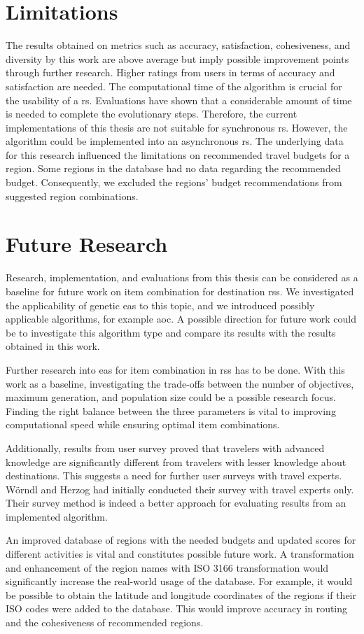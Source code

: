 \section{Limitations}
The results obtained on metrics such as accuracy, satisfaction, cohesiveness, and diversity by this work are above average but imply possible improvement points through further research. Higher ratings from users in terms of accuracy and satisfaction are needed. The computational time of the algorithm is crucial for the usability of a \gls{rs}. Evaluations have shown that a considerable amount of time is needed to complete the evolutionary steps. Therefore, the current implementations of this thesis are not suitable for synchronous \gls{rs}. However, the algorithm could be implemented into an asynchronous \gls{rs}. The underlying data for this research influenced the limitations on recommended travel budgets for a region. Some regions in the database had no data regarding the recommended budget. Consequently, we excluded the regions' budget recommendations from suggested region combinations.



\section{Future Research}
Research, implementation, and evaluations from this thesis can be considered as a baseline for future work on item combination for destination \glspl{rs}. We investigated the applicability of genetic \glspl{ea} to this topic, and we introduced possibly applicable algorithms, for example \gls{aoc}. A possible direction for future work could be to investigate this algorithm type and compare its results with the results obtained in this work.

Further research into \glspl{ea} for item combination in \glspl{rs} has to be done. With this work as a baseline, investigating the trade-offs between the number of objectives, maximum generation, and population size could be a possible research focus. Finding the right balance between the three parameters is vital to improving computational speed while ensuring optimal item combinations.

Additionally, results from user survey proved that travelers with advanced knowledge are significantly different from travelers with lesser knowledge about destinations. This suggests a need for further user surveys with travel experts. Wörndl and Herzog had initially conducted their survey with travel experts only. Their survey method is indeed a better approach for evaluating results from an implemented algorithm.

An improved database of regions with the needed budgets and updated scores for different activities is vital and constitutes possible future work. A transformation and enhancement of the region names with ISO 3166 transformation would significantly increase the real-world usage of the database. For example, it would be possible to obtain the latitude and longitude coordinates of the regions if their ISO codes were added to the database. This would improve accuracy in routing and the cohesiveness of recommended regions.